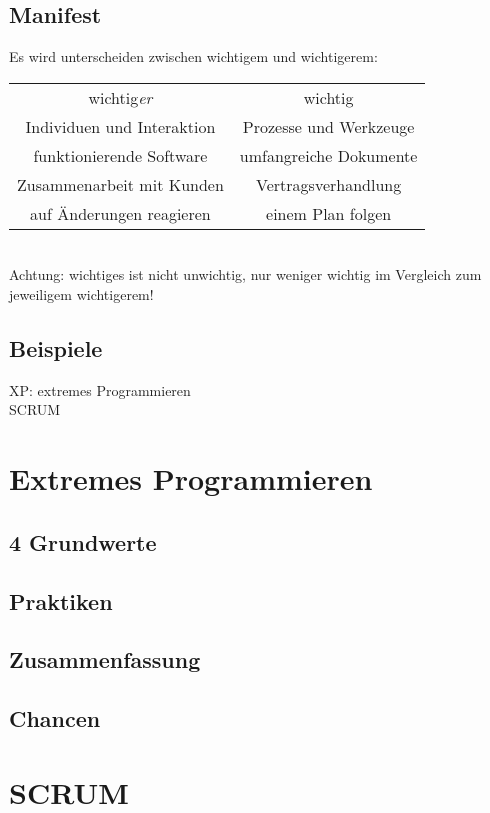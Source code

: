 \subsection{Manifest}
Es wird unterscheiden zwischen wichtigem und wichtigerem:\\
\begin{tabular}{c c}
wichtig\emph{er} & wichtig\\
Individuen und Interaktion & Prozesse und Werkzeuge\\
funktionierende Software & umfangreiche Dokumente\\
Zusammenarbeit mit Kunden & Vertragsverhandlung\\
auf Änderungen reagieren & einem Plan folgen
\end{tabular}\\
Achtung: wichtiges ist nicht unwichtig, nur weniger wichtig im Vergleich zum jeweiligem wichtigerem!

\subsection{Beispiele}
XP: extremes Programmieren\\
SCRUM

\section{Extremes Programmieren}

\subsection{4 Grundwerte}

\subsection{Praktiken}

\subsection{Zusammenfassung}

\subsection{Chancen}

\section{SCRUM}

